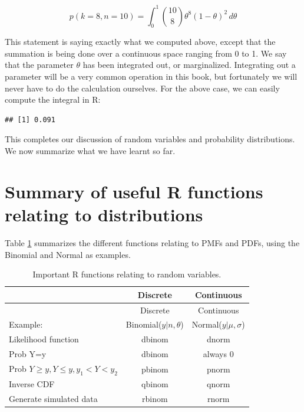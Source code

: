 \documentclass[12pt,]{krantz}
\newenvironment{Shaded}{\begin{snugshade}}{\end{snugshade}}
\newcommand{\ControlFlowTok}[1]{\textcolor[rgb]{0.13,0.29,0.53}{\textbf{#1}}}
\newcommand{\DataTypeTok}[1]{\textcolor[rgb]{0.13,0.29,0.53}{#1}}
\newcommand{\DecValTok}[1]{\textcolor[rgb]{0.00,0.00,0.81}{#1}}
\newcommand{\KeywordTok}[1]{\textcolor[rgb]{0.13,0.29,0.53}{\textbf{#1}}}
\newcommand{\NormalTok}[1]{#1}
\newcommand{\OperatorTok}[1]{\textcolor[rgb]{0.81,0.36,0.00}{\textbf{#1}}}
\newcommand{\StringTok}[1]{\textcolor[rgb]{0.31,0.60,0.02}{#1}}
\theoremstyle{definition}
\theoremstyle{definition}
\theoremstyle{definition}
\theoremstyle{remark}
\begin{document}
\begin{equation}
p(k=8,n=10) = \int_0^1 \binom{10}{8} \theta^8 (1-\theta)^{2}\, d\theta
\end{equation}

This statement is saying exactly what we computed above, except that the summation is being done over a continuous space ranging from 0 to 1. We say that the parameter \(\theta\) has been integrated out, or marginalized. Integrating out a parameter will be a very common operation in this book, but fortunately we will never have to do the calculation ourselves. For the above case, we can easily compute the integral in R:

\begin{Shaded}
\end{Shaded}

\begin{verbatim}
## [1] 0.091
\end{verbatim}

This completes our discussion of random variables and probability distributions. We now summarize what we have learnt so far.

\hypertarget{summary-of-useful-r-functions-relating-to-distributions}{%
\section{Summary of useful R functions relating to distributions}\label{summary-of-useful-r-functions-relating-to-distributions}}

Table \ref{tab:dpqrfunctions} summarizes the different functions relating to PMFs and PDFs, using the Binomial and Normal as examples.

\begin{longtable}[]{@{}lcc@{}}
\caption{\label{tab:dpqrfunctions} Important R functions relating to random variables.}\tabularnewline
\toprule
& Discrete & Continuous\tabularnewline
\midrule
\endfirsthead
\toprule
& Discrete & Continuous\tabularnewline
\midrule
\endhead
Example: & Binomial(\(y|n,\theta\)) & Normal(\(y|\mu,\sigma\))\tabularnewline
Likelihood function & dbinom & dnorm\tabularnewline
Prob Y=y & dbinom & always 0\tabularnewline
Prob \(Y\geq y, Y\leq y, y_1<Y<y_2\) & pbinom & pnorm\tabularnewline
Inverse CDF & qbinom & qnorm\tabularnewline
Generate simulated data & rbinom & rnorm\tabularnewline
\bottomrule
\end{longtable}
\end{document}
